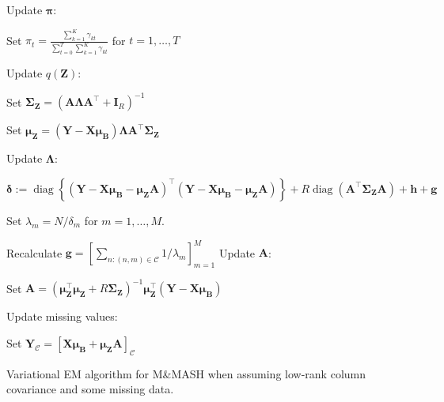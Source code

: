 \documentclass[11pt,authoryear]{article}
\DeclareMathOperator*{\diag}{diag}
\newcommand{\bs}[1]{\boldsymbol{#1}}
\begin{document}
\begin{algorithm}
\begin{algorithmic}
  \STATE Update $\bs{\pi}$:
  \begin{description}
  \item Set $\pi_t = \frac{\sum_{k = 1}^K\gamma_{kt}}{\sum_{t = 0}^T\sum_{k = 1}^K\gamma_{kt}}$ for $t = 1,\ldots, T$
  \end{description}
  \STATE Update $q(\bs{Z})$:
  \begin{description}
  \item Set $\bs{\Sigma}_{\bs{Z}} = \left(\bs{A}\bs{\Lambda}\bs{A}^{\intercal} + \bs{I}_R\right)^{-1}$
  \item Set $\bs{\mu}_{\bs{Z}} = (\bs{Y}-\bs{X}\bs{\mu}_{\bs{B}})\bs{\Lambda} \bs{A}^{\intercal}\bs{\Sigma}_{\bs{Z}}$
  \end{description}
  \STATE Update $\bs{\Lambda}$:
  \begin{description}
  \item $\bs{\delta} := \diag\left\{(\bs{Y}-\bs{X}\bs{\mu}_{\bs{B}} - \bs{\mu}_{\bs{Z}}\bs{A})^{\intercal}(\bs{Y}-\bs{X}\bs{\mu}_{\bs{B}} - \bs{\mu}_{\bs{Z}}\bs{A})\right\} + R\diag(\bs{A}^{\intercal}\bs{\Sigma}_{\bs{Z}}\bs{A}) + \bs{h} + \bs{g}$
  \item Set $\lambda_m = N / \delta_m$ for $m = 1,\ldots,M$.
  \end{description}
  \STATE Recalculate $\bs{g} = \left[\sum_{n: (n, m) \in \mathcal{C}} 1 / \lambda_m\right]_{m = 1}^M$
  \STATE Update $\bs{A}$:
  \begin{description}
  \item Set $\bs{A} = \left(\bs{\mu}_{\bs{Z}}^{\intercal}\bs{\mu}_{\bs{Z}} + R\bs{\Sigma}_{\bs{Z}}\right)^{-1} \bs{\mu}_{\bs{Z}}^{\intercal}(\bs{Y} - \bs{X}\bs{\mu}_{\bs{B}})$
  \end{description}
  \STATE Update missing values:
  \begin{description}
  \item Set $\bs{Y}_{\mathcal{C}} = \left[\bs{X}\bs{\mu}_{\bs{B}} + \bs{\mu}_{\bs{Z}}\bs{A}\right]_{\mathcal{C}}$
  \end{description}
\end{algorithmic}
\caption{Variational EM algorithm for M\&MASH when assuming low-rank column covariance and some missing data.}
\label{algorithm:vem.missing}
\end{algorithm}
\end{document}
